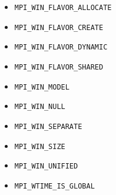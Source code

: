 \begin{multicols}{3}
\begin{itemize}
\item \texttt{MPI_WIN_FLAVOR_ALLOCATE}~\pageref{def:MPI_WIN_FLAVOR_ALLOCATE}
\item \texttt{MPI_WIN_FLAVOR_CREATE}~\pageref{def:MPI_WIN_FLAVOR_CREATE}
\item \texttt{MPI_WIN_FLAVOR_DYNAMIC}~\pageref{def:MPI_WIN_FLAVOR_DYNAMIC}
\item \texttt{MPI_WIN_FLAVOR_SHARED}~\pageref{def:MPI_WIN_FLAVOR_SHARED}
\item \texttt{MPI_WIN_MODEL}~\pageref{def:MPI_WIN_MODEL}
\item \texttt{MPI_WIN_NULL}~\pageref{def:MPI_WIN_NULL}
\item \texttt{MPI_WIN_SEPARATE}~\pageref{def:MPI_WIN_SEPARATE}
\item \texttt{MPI_WIN_SIZE}~\pageref{def:MPI_WIN_SIZE}
\item \texttt{MPI_WIN_UNIFIED}~\pageref{def:MPI_WIN_UNIFIED}
\item \texttt{MPI_WTIME_IS_GLOBAL}~\pageref{def:MPI_WTIME_IS_GLOBAL}
\end{itemize}
\end{multicols}
